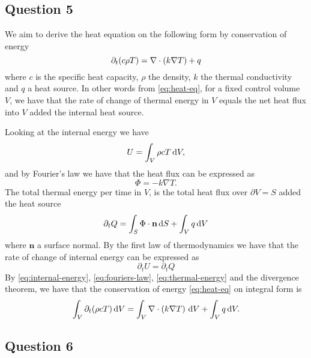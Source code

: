 \subsection{Question 5}
We aim to derive the heat equation on the following form by conservation of energy
\begin{equation}
  \partial_t (c\rho T) = \nabla \cdot \left(  k\nabla T  \right) + q
  \label{eq:heat-eq}
\end{equation}
where $c$ is the specific heat capacity, $\rho$ the density, $k$ the thermal conductivity and $q$ a heat source. 
In other words from \eqref{eq:heat-eq}, for a fixed control volume $V$, we have that the rate of change of thermal energy in $V$ equals the net heat flux into $V$ added the internal heat source.

Looking at the internal energy we have
\begin{equation}
  U = \int_V \rho cT \, \mathrm{d} V,
  \label{eq:internal-energy}
\end{equation}
and by Fourier's law we have that the heat flux can be expressed as
\begin{equation}
  \Phi = -k\nabla T.
  \label{eq:fouriers-law}
\end{equation}
The total thermal energy per time in $V$, is the total heat flux over $\partial V = S$ added the heat source
\begin{equation}
  \partial_t Q = \int_S \Phi \cdot \mathbf{n} \, \mathrm{d} S + \int_V q \, \mathrm{d} V
  \label{eq:thermal-energy}
\end{equation}
where $\mathbf{n}$ a surface normal.
By the first law of thermodynamics we have that the rate of change of internal energy can be expressed as
\begin{equation}
  \partial_t U = \partial_t Q
  \label{eq:TD1}
\end{equation}
By \eqref{eq:internal-energy}, \eqref{eq:fouriers-law}, \eqref{eq:thermal-energy} and the divergence theorem, we have that the conservation of energy \eqref{eq:heat-eq} on integral form is
\begin{equation}
  \int_V  \partial_t (\rho cT) \, \mathrm{d} V = \int_V \nabla \cdot \left(  k\nabla T  \right) \, \mathrm{d} V + \int_V q \, \mathrm{d} V.
  \label{eq:int-form}
\end{equation}


\subsection{Question 6}

